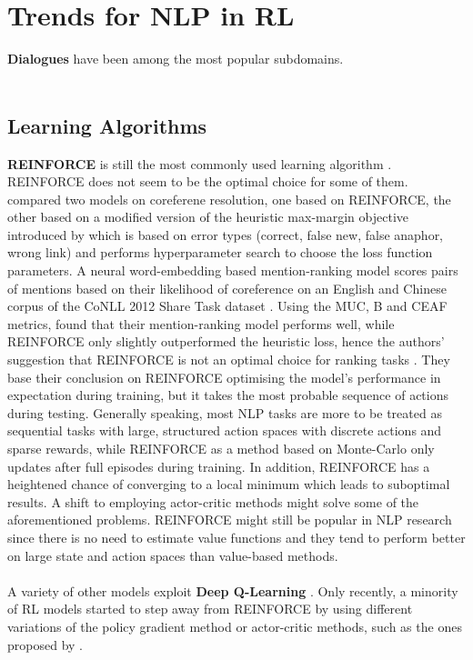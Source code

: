 \documentclass[11pt,a4paper]{article}
\begin{document}
\section{Trends for NLP in RL}
\textbf{Dialogues} have been among the most popular subdomains.\\\\ 

\subsection{Learning Algorithms}
\textbf{REINFORCE} is still the most commonly used learning algorithm \citep{yasui-etal-2019, zhang-2018, hu-etal-2018-playing, godin-etal-2019-learning, huang-etal-2018-neural, mao-etal-2018-end, ranzato2015sequence, wu-etal-2018-study, clark-manning-2016-deep,yogatama-2017, guu-etal-2017-language, zeng-2018}. REINFORCE does not seem to be the optimal choice for some of them. \citet{clark-manning-2016-deep} compared two models on coreferene resolution, one based on REINFORCE, the other based on a modified version of the heuristic max-margin objective introduced by \citep{wiseman-etal-2015-learning} which is based on error types (correct, false new, false anaphor, wrong link) and performs hyperparameter search to choose the loss function parameters. A neural word-embedding based mention-ranking model scores pairs of mentions based on their likelihood of coreference on an English and Chinese corpus of the CoNLL 2012 Share Task dataset \citet{conll-2012}. Using the MUC, B and CEAF metrics, \citet{clark-manning-2016-deep} found that their mention-ranking model performs well, while REINFORCE only slightly outperformed the heuristic loss, hence the authors' suggestion that REINFORCE is not an optimal choice for ranking tasks \citet{grishman-sundheim-1996-message, cai-strube-2010-evaluation}. They base their conclusion on REINFORCE optimising the model's performance in expectation during training, but it takes the most probable sequence of actions during testing. Generally speaking, most NLP tasks are more to be treated as sequential tasks with large, structured action spaces with discrete actions and sparse rewards, while REINFORCE as a method based on Monte-Carlo only updates after full episodes during training. In addition, REINFORCE has a heightened chance of converging to a local minimum which leads to suboptimal results. A shift to employing actor-critic methods might solve some of the aforementioned problems. REINFORCE might still be popular in NLP research since there is no need to estimate value functions and they tend to perform better on large state and action spaces than value-based methods. \\\\
A variety of other models exploit \textbf{Deep Q-Learning} \citep{narasimhan-etal-2016-improving, mosallanezhad-etal-2019-deep, ling-etal-2017-learning}. Only recently, a minority of RL models started to step away from REINFORCE by using different variations of the policy gradient method \citep{branavan-2009, li-etal-2018-paraphrase, li-etal-2016-deep, le-fokkens-2017-tackling} or actor-critic methods, such as the ones proposed by \citet{dethlefs-cuayahuitl-2011,grissom-ii-etal-2014-dont, he-etal-2016-deep-reinforcement, chen-bansal-2018-fast, goyal-2019}. 
\end{document}
